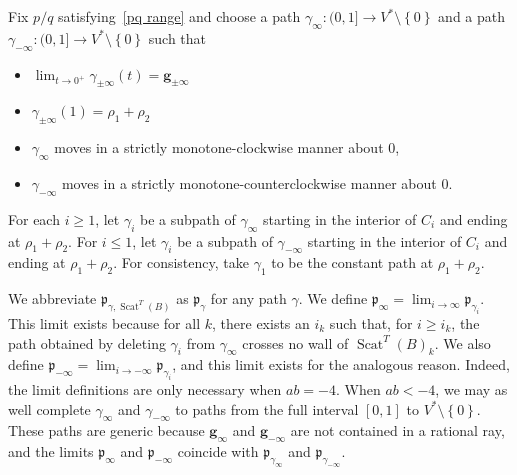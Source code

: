\documentclass[ALCO,ThmDefs,Unicode,epreuves]{cedram}
\DeclareMathOperator{\Scat}{Scat}
\newcommand{\set}[1]{{\left\lbrace #1 \right\rbrace}}
\newcommand{\p}{{\mathfrak p}}
\newcommand{\g}{\mathbf{g}}
\begin{document}
Fix $p/q$ satisfying~\eqref{pq range} and choose a path $\gamma_\infty:(0,1]\to V^*\setminus\set{0}$ and a path ${\gamma_{-\infty}:(0,1]\to V^*\setminus\set{0}}$ such that
\begin{itemize} 
\item $\lim_{t\to0^+}\gamma_{\pm\infty}(t)=\g_{\pm\infty}$
\item $\gamma_{\pm\infty}(1)=\rho_1+\rho_2$
\item $\gamma_\infty$ moves in a strictly monotone-clockwise manner about $0$,
\item $\gamma_{-\infty}$ moves in a strictly monotone-counterclockwise manner about $0$.
\end{itemize}
For each $i\ge1$, let $\gamma_i$ be a subpath of $\gamma_{\infty}$ starting in the interior of $C_i$ and ending at $\rho_1+\rho_2$.
For $i\le1$, let $\gamma_i$ be a subpath of $\gamma_{-\infty}$ starting in the interior of $C_i$ and ending at $\rho_1+\rho_2$.
For consistency, take $\gamma_1$ to be the constant path at $\rho_1+\rho_2$.

We abbreviate $\p_{\gamma,\Scat^T(B)}$ as $\p_\gamma$ for any path $\gamma$.
We define $\p_\infty=\lim_{i\to\infty}\p_{\gamma_i}$.
This limit exists because for all $k$, there exists an $i_k$ such that, for $i\ge i_k$, the path obtained by deleting $\gamma_i$ from $\gamma_\infty$ crosses no wall of $\Scat^T(B)_k$.
We also define $\p_{-\infty}=\lim_{i\to-\infty}\p_{\gamma_i}$, and this limit exists for the analogous reason.
Indeed, the limit definitions are only necessary when $ab=-4$. 
When $ab<-4$, we may as well complete $\gamma_\infty$ and $\gamma_{-\infty}$ to paths from the full interval $[0,1]$ to $V^*\setminus\set{0}$. 
These paths are generic because $\g_\infty$ and $\g_{-\infty}$ are not contained in a rational ray, and the limits $\p_\infty$ and $\p_{-\infty}$ coincide with $\p_{\gamma_\infty}$ and $\p_{\gamma_{-\infty}}$.
\end{document}
